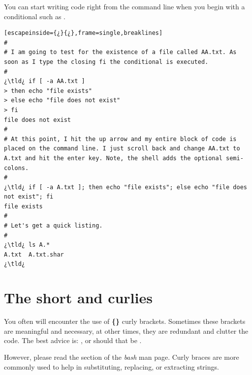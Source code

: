 You can start writing code right from the command line when you begin with a conditional such as .

\begin{lstlisting}[escapeinside={¿}{¿},frame=single,breaklines]
#
# I am going to test for the existence of a file called AA.txt. As soon as I type the closing fi the conditional is executed.
#
¿\tld¿ if [ -a AA.txt ]
> then echo "file exists"
> else echo "file does not exist"
> fi
file does not exist
#
# At this point, I hit the up arrow and my entire block of code is placed on the command line. I just scroll back and change AA.txt to A.txt and hit the enter key. Note, the shell adds the optional semi-colons.
#
¿\tld¿ if [ -a A.txt ]; then echo "file exists"; else echo "file does not exist"; fi
file exists
#
# Let's get a quick listing.
#
¿\tld¿ ls A.*
A.txt  A.txt.shar
¿\tld¿ 
\end{lstlisting}


\section{The short and curlies}

You often will encounter the use of \textbf{\{\}} curly brackets. Sometimes these brackets are meaningful and necessary, at other times, they are redundant and clutter the code. The best advice is: ,  or should that be .

However, please read the  section of the \emph{bash} man page. Curly braces are more commonly used to help in substituting, replacing, or extracting strings.


